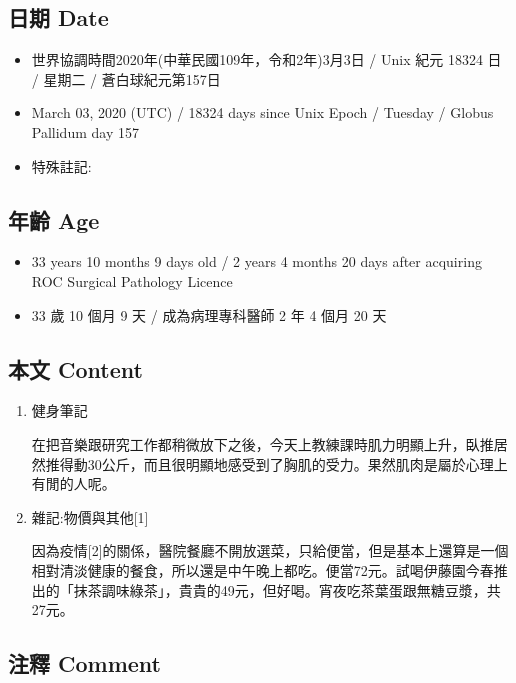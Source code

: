 \documentclass[a5paper, 12pt
]{book}
\providecommand{\tightlist}{%
  \setlength{\itemsep}{0pt}\setlength{\parskip}{0pt}}
\begin{document}
\hypertarget{ux65e5ux671f-date-2}{%
\subsection{日期 Date}\label{ux65e5ux671f-date-2}}

\begin{itemize}
\tightlist
\item
  世界協調時間2020年(中華民國109年，令和2年)3月3日 / Unix 紀元 18324 日
  / 星期二 / 蒼白球紀元第157日
\item
  March 03, 2020 (UTC) / 18324 days since Unix Epoch / Tuesday / Globus
  Pallidum day 157
\item
  特殊註記:
\end{itemize}

\hypertarget{ux5e74ux9f61-age-2}{%
\subsection{年齡 Age}\label{ux5e74ux9f61-age-2}}

\begin{itemize}
\tightlist
\item
  33 years 10 months 9 days old / 2 years 4 months 20 days after
  acquiring ROC Surgical Pathology Licence
\item
  33 歲 10 個月 9 天 / 成為病理專科醫師 2 年 4 個月 20 天
\end{itemize}

\hypertarget{ux672cux6587-content-2}{%
\subsection{本文 Content}\label{ux672cux6587-content-2}}

\begin{enumerate}
\def\labelenumi{\arabic{enumi}.}
\item
  健身筆記

  在把音樂跟研究工作都稍微放下之後，今天上教練課時肌力明顯上升，臥推居然推得動30公斤，而且很明顯地感受到了胸肌的受力。果然肌肉是屬於心理上有閒的人呢。
\item
  雜記:物價與其他{[}1{]}

  因為疫情{[}2{]}的關係，醫院餐廳不開放選菜，只給便當，但是基本上還算是一個相對清淡健康的餐食，所以還是中午晚上都吃。便當72元。試喝伊藤園今春推出的「抹茶調味綠茶」，貴貴的49元，但好喝。宵夜吃茶葉蛋跟無糖豆漿，共27元。
\end{enumerate}

\hypertarget{ux6ce8ux91cb-comment-2}{%
\subsection{注釋 Comment}\label{ux6ce8ux91cb-comment-2}}
\end{document}
